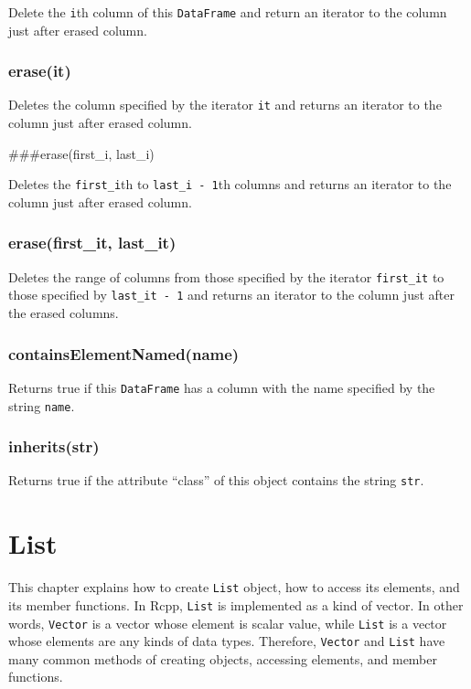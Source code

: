 \documentclass[]{book}
\begin{document}
Delete the \texttt{i}th column of this \texttt{DataFrame} and return an iterator to the column just after erased column.

\hypertarget{eraseit-1}{%
\subsection{erase(it)}\label{eraseit-1}}

Deletes the column specified by the iterator \texttt{it} and returns an iterator to the column just after erased column.

\#\#\#erase(first\_i, last\_i)

Deletes the \texttt{first\_i}th to \texttt{last\_i\ -\ 1}th columns and returns an iterator to the column just after erased column.

\hypertarget{erasefirst_it-last_it}{%
\subsection{erase(first\_it, last\_it)}\label{erasefirst_it-last_it}}

Deletes the range of columns from those specified by the iterator \texttt{first\_it} to those specified by \texttt{last\_it\ -\ 1} and returns an iterator to the column just after the erased columns.

\hypertarget{containselementnamedname-1}{%
\subsection{containsElementNamed(name)}\label{containselementnamedname-1}}

Returns true if this \texttt{DataFrame} has a column with the name specified by the string \texttt{name}.

\hypertarget{inheritsstr}{%
\subsection{inherits(str)}\label{inheritsstr}}

Returns true if the attribute ``class'' of this object contains the string \texttt{str}.

\hypertarget{list}{%
\chapter{List}\label{list}}

This chapter explains how to create \texttt{List} object, how to access its elements, and its member functions. In Rcpp, \texttt{List} is implemented as a kind of vector. In other words, \texttt{Vector} is a vector whose element is scalar value, while \texttt{List} is a vector whose elements are any kinds of data types. Therefore, \texttt{Vector} and \texttt{List} have many common methods of creating objects, accessing elements, and member functions.
\end{document}
